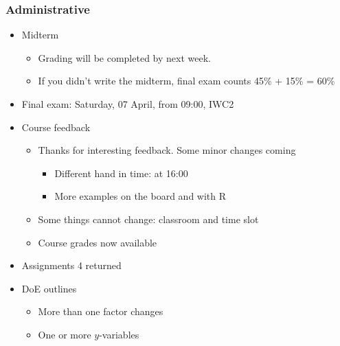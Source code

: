 \begin{frame}\frametitle{Administrative}
	\begin{itemize}
		\item	Midterm
		\begin{itemize}
			\item	Grading will be completed by next week.
			\item	If you didn't write the midterm, final exam counts 45\% + 15\% = 60\%
		\end{itemize}
	\end{itemize}
	\begin{itemize}
		\item	Final exam: Saturday, 07 April, from 09:00, IWC2
	\end{itemize}
	\begin{itemize}
		\item	Course feedback
		\begin{itemize}
			\item	Thanks for interesting feedback. Some minor changes coming
			\begin{itemize}
				\item	Different hand in time: at 16:00
				\item	More examples on the board and with R
			\end{itemize}
			\item	Some things cannot change: classroom and time slot
			\item	Course grades now available
		\end{itemize}
	\end{itemize}
	\begin{itemize}
		\item	Assignments 4 returned
	\end{itemize}
	\begin{itemize}
		\item	DoE outlines
		\begin{itemize}
			\item	More than one factor changes
			\item	One or more $y$-variables
		\end{itemize}
	\end{itemize}
\end{frame}

